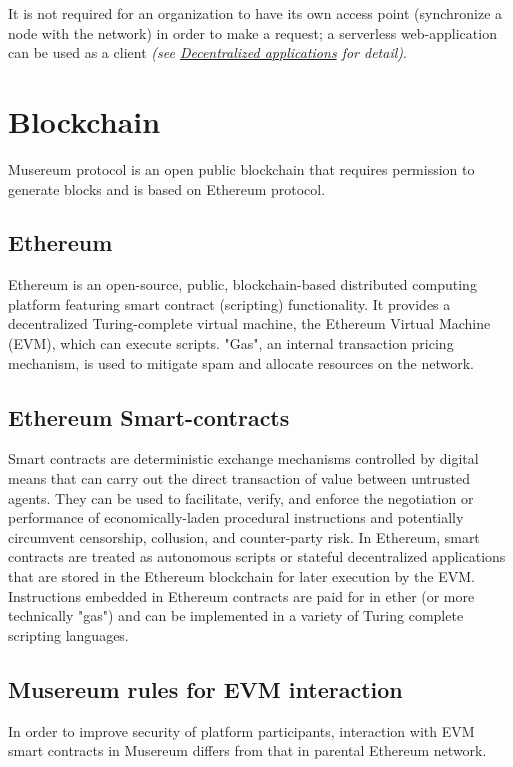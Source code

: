 \documentclass[12pt]{report}
\begin{document}
It is not required for an organization to have its own access point (synchronize a node with the network) in order to make a request; a serverless web-application can be used as a client \textit{(see \hyperref[tech-apps]{Decentralized applications} for detail)}.

\section{Blockchain}
\label{tech-blockchain}
Musereum protocol is an open public blockchain that requires permission to generate blocks and is based on Ethereum protocol.


\subsection{Ethereum}
\label{tech-blockchain-evm}
Ethereum is an open-source, public, blockchain-based distributed computing platform featuring smart contract (scripting) functionality. It provides a decentralized Turing-complete virtual machine, the Ethereum Virtual Machine (EVM), which can execute scripts. "Gas", an internal transaction pricing mechanism, is used to mitigate spam and allocate resources on the network.
\subsection{Ethereum Smart-contracts}
\label{tech-blockchain-contracts}
Smart contracts are deterministic exchange mechanisms controlled by digital means that can carry out the direct transaction of value between untrusted agents. They can be used to facilitate, verify, and enforce the negotiation or performance of economically-laden procedural instructions and potentially circumvent censorship, collusion, and counter-party risk. In Ethereum, smart contracts are treated as autonomous scripts or stateful decentralized applications that are stored in the Ethereum blockchain for later execution by the EVM. Instructions embedded in Ethereum contracts are paid for in ether (or more technically "gas") and can be implemented in a variety of Turing complete scripting languages.
\subsection{Musereum rules for EVM interaction}
\label{tech-blockchain-rules}
In order to improve security of platform participants, interaction with EVM smart contracts in Musereum differs from that in parental Ethereum network.
\end{document}
